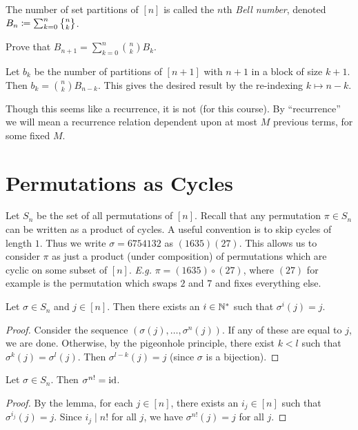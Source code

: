 \begin{definition*} \label{def:bell}
    The number of set partitions of $[n]$ is called the $n$th \emph{Bell
    number}, denoted $B_n \coloneq \sum_{k=0}^{n} \stirling nk$.
\end{definition*}

\begin{exercise*}
    Prove that $B_{n+1} = \sum_{k=0}^{n} \binom{n}{k} B_k$.
\end{exercise*}
\begin{solution}
    Let $b_k$ be the number of partitions of $[n+1]$ with $n+1$ in a block
    of size $k+1$.
    Then $b_k = \binom{n}{k} B_{n-k}$.
    This gives the desired result by the re-indexing $k \mapsto n-k$.
\end{solution}
Though this seems like a recurrence, it is not (for this course).
By ``recurrence'' we will mean a recurrence relation dependent upon at most
$M$ previous terms, for some fixed $M$.

\section{Permutations as Cycles} \label{sec:perm:cycles}
Let $S_n$ be the set of all permutations of $[n]$.
Recall that any permutation $\pi \in S_n$ can be written as a product of
cycles.
A useful convention is to skip cycles of length $1$.
Thus we write $\sigma = 6754132$ as $(1635)(27)$.
This allows us to consider $\pi$ as just a product (under composition) of
permutations which are cyclic on some subset of $[n]$.
\textit{E.g.} $\pi = (1635) \circ (27)$, where $(27)$ for example is the
permutation which swaps $2$ and $7$ and fixes everything else.

\begin{lemma}
    Let $\sigma \in S_n$ and $j \in [n]$.
    Then there exists an $i \in \mathbb{N}^*$ such that $\sigma^i(j) = j$.
\end{lemma}
\begin{proof}
    Consider the sequence $(\sigma(j), \dots, \sigma^n(j))$.
    If any of these are equal to $j$, we are done.
    Otherwise, by the pigeonhole principle, there exist $k < l$ such that
    $\sigma^k(j) = \sigma^l(j)$.
    Then $\sigma^{l-k}(j) = j$ (since $\sigma$ is a bijection).
\end{proof}
\begin{corollary}
    Let $\sigma \in S_n$.
    Then $\sigma^{n!} = \mathrm{id}$.
\end{corollary}
\begin{proof}
    By the lemma, for each $j \in [n]$, there exists an $i_j \in [n]$ such
    that $\sigma^{i_j}(j) = j$.
    Since $i_j \mid n!$ for all $j$, we have $\sigma^{n!}(j) = j$ for all
    $j$.
\end{proof}

